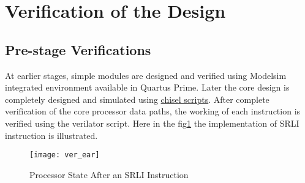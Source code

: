 \documentclass[12pt]{article}
\begin{document}
\section{Verification of the Design}
    \subsection{Pre-stage Verifications}
    At earlier stages, simple modules are designed and verified using Modelsim integrated environment available in Quartus Prime.
    Later the core design is completely designed and simulated using \href{https://gist.github.com/dakshinatharindu}{chisel scripts}.
    After complete verification of the core processor data paths, the working of each instruction is verified using the verilator script.
    Here in the fig\ref{fig:srli} the implementation of SRLI instruction is illustrated.
    \begin{figure}[h]
        \centering
        \texttt{[image: ver\_ear]}
        \caption{Processor State After an SRLI Instruction}
        \label{fig:srli}
    \end{figure}
\end{document}
